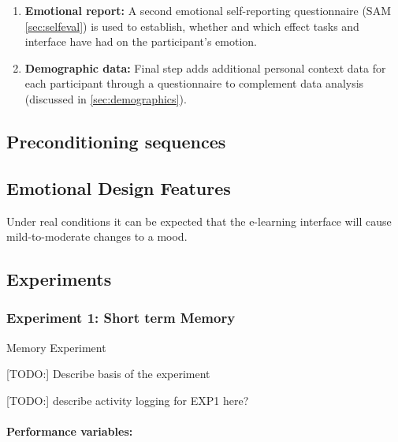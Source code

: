 \begin{enumerate}
		\item \textbf{Emotional report:} A second emotional self-reporting questionnaire (SAM \ref{sec:selfeval}) is used to establish, whether and which effect tasks and interface have had on the participant's emotion.
		
		\item \textbf{Demographic data:} Final step adds additional personal context data for each participant through a questionnaire to complement data analysis (discussed in \ref{sec:demographics}).
		
	\end{enumerate}
	
	\subsection{Preconditioning sequences} \label{preconditioning}
	
	
	
	\subsection{Emotional Design Features}

Under real conditions it can be expected that the e-learning interface will cause mild-to-moderate changes to a mood.
	
	
	
	
	\subsection{Experiments}

		\subsubsection{Experiment 1: Short term Memory} \label{sec:memory}
		
		Memory Experiment 
		
		[TODO:] Describe basis of the experiment
		
		[TODO:] describe activity logging for EXP1 here?
		
		\paragraph{Performance variables:} \label{sec:memory-parameters}
		
